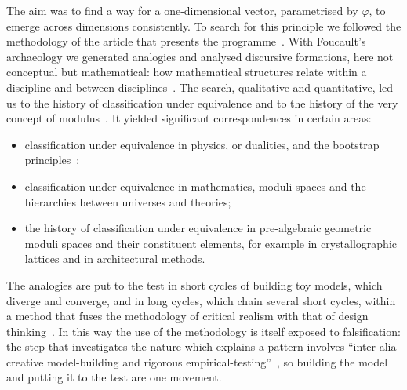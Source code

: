 \documentclass[11pt,reqno]{amsart}
\newcommand{\golden}{\varphi}
\numberwithin{equation}{section}
\theoremstyle{remark}
\begin{document}
The aim was to find a way for a one-dimensional vector, parametrised by $\golden$, to emerge across dimensions consistently.
To search for this principle we followed the methodology of the article that presents the
programme~\cite{PRES}. With Foucault's archaeology we generated analogies and analysed discursive
formations, here not conceptual but mathematical: how mathematical structures relate within a
discipline and between disciplines~\cite{Fou69}. The search, qualitative and quantitative, led us to
the history of classification under equivalence and to the history of the very concept of
modulus~\cite{REPR}. It yielded significant correspondences in certain areas:
\begin{itemize}
\item classification under equivalence in physics, or dualities, and the bootstrap
principles~\cite{PRV19};
\item classification under equivalence in mathematics, moduli spaces and the hierarchies between
universes and theories;
\item the history of classification under equivalence in pre-algebraic geometric moduli spaces and
their constituent elements, for example in crystallographic lattices and in architectural methods.
\end{itemize}
The analogies are put to the test in short cycles of building toy models, which diverge and
converge, and in long cycles, which chain several short cycles, within a method that fuses the
methodology of critical realism with that of design thinking~\cite{PRES,Bro08,DC07}. In this way the use of the methodology is itself exposed to falsification: the step that investigates the nature which explains a pattern involves ``inter alia creative model-building and rigorous empirical-testing''~\cite[p.~163]{Bha75}, so building the model and putting it to the test are one movement.
\end{document}
